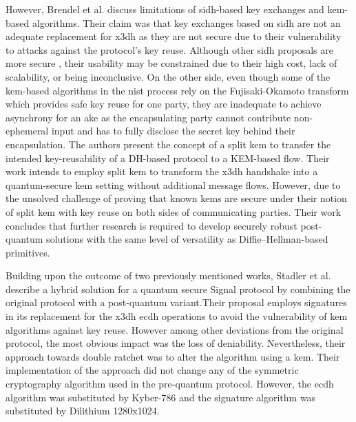 \par
However, Brendel et al. \cite{brendel2020towards} discuss limitations of \gls{sidh}-based key exchanges and \gls{kem}-based algorithms. Their claim was that key exchanges based on \gls{sidh} are not an adequate replacement for \gls{x3dh} as they are not secure due to their vulnerability to attacks against the protocol's key reuse. Although other \gls{sidh} proposals are more secure \cite{azarderakhsh2017post,basso2020adaptive,boneh2020multiparty}, their usability may be constrained due to their high cost, lack of scalability, or being inconclusive. On the other side, even though some of the \gls{kem}-based algorithms in the \gls{nist} process rely on the Fujisaki-Okamoto transform which provides safe key reuse for one party, they are inadequate to achieve asynchrony for an \gls{ake} as the encapsulating party cannot contribute non-ephemeral input and has to fully disclose the secret key behind their encapsulation. The authors present the concept of a split \gls{kem} to transfer the intended key-reusability of a DH-based protocol to a KEM-based flow. Their work intends to employ split \gls{kem} to transform the \gls{x3dh} handshake into a quantum-secure \gls{kem} setting without additional message flows. However, due to the unsolved challenge of proving that known \glspl{kem} are secure under their notion of split \gls{kem} with key reuse on both sides of communicating parties. Their work concludes that further research is required to develop securely robust post-quantum solutions with the same level of versatility as Diffie–Hellman-based primitives.
\par 
Building upon the outcome of two previously mentioned works, Stadler et al. \cite{stadler2021hybrid} describe a hybrid solution for a quantum secure Signal protocol by combining the original protocol with a post-quantum variant.Their proposal employs signatures in its replacement for the \gls{x3dh} \gls{ecdh} operations to avoid the vulnerability of \gls{kem} algorithms against key reuse. However among other deviations from the original protocol, the most obvious impact was the loss of deniability. Nevertheless, their approach towards double ratchet was to alter the algorithm using a \gls{kem}. Their implementation of the approach did not change any of the symmetric cryptography algorithm used in the pre-quantum protocol. However, the \gls{ecdh} algorithm was substituted by Kyber-786 and the signature algorithm was substituted by Dilithium 1280x1024. 